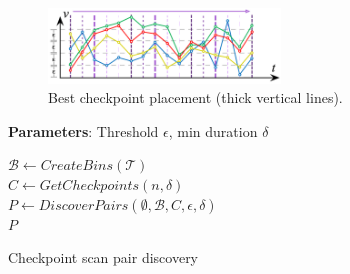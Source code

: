 \begin{figure}[!tb]
    \centering
    \includegraphics[width=0.55\textwidth]{figures/heuristic.png}
    \caption{Best checkpoint placement (thick vertical lines).}
    \label{fig:heuristic1}
\end{figure}


\setlength{\textfloatsep}{4pt}
\begin{algorithm}[tb]
    \DontPrintSemicolon
    \begin{footnotesize}
    \nonl \textbf{Parameters}: Threshold $\epsilon$, min duration $\delta$ \\
    \vspace{4pt}
    
    $\mathcal{B} \leftarrow CreateBins(\mathcal{T})$ \\
    $C \leftarrow GetCheckpoints(n, \delta)$ \\
    $P \leftarrow DiscoverPairs(\emptyset, \mathcal{B}, C, \epsilon, \delta)$ \\
    \KwRet $P$ \\
    
    \vspace{4pt}
    \end{footnotesize}
    \caption{Checkpoint scan pair discovery}
    \label{alg:checkpoint_scan_sim}
\end{algorithm}

